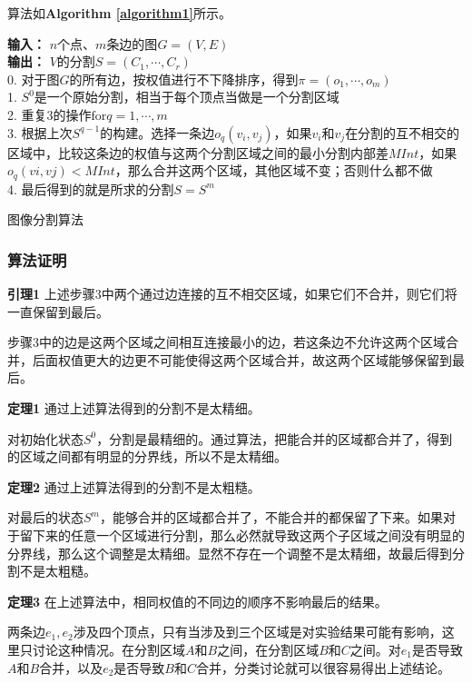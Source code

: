 \documentclass[a4paper, 12pt, UTF8]{article}
\begin{document}
算法如\textbf{Algorithm \ref{algorithm1}}所示。

\begin{algorithm}[h!]
\textbf{输入：} $n$个点、$m$条边的图$G = (V, E)$ \\
\textbf{输出：} $V$的分割$S = (C_1, \cdots, C_r)$ \\
0. 对于图$G$的所有边，按权值进行不下降排序，得到$\pi = (o_1, \cdots, o_m)$ \\
1. $S^0$是一个原始分割，相当于每个顶点当做是一个分割区域 \\
2. 重复3的操作$\text{for} q = 1, \cdots, m$ \\
3. 根据上次$S^{q - 1}$的构建。选择一条边$o_q(v_i, v_j)$，如果$v_i$和$v_j$在分割的互不相交的区域中，比较这条边的权值与这两个分割区域之间的最小分割内部差$MInt$，如果$o_q(vi, vj) < MInt$，那么合并这两个区域，其他区域不变；否则什么都不做 \\
4. 最后得到的就是所求的分割$S = S^m$
\caption{图像分割算法}
\label{algorithm1}
\end{algorithm}

\subsubsection{算法证明}

\textbf{引理1} 上述步骤3中两个通过边连接的互不相交区域，如果它们不合并，则它们将一直保留到最后。

步骤3中的边是这两个区域之间相互连接最小的边，若这条边不允许这两个区域合并，后面权值更大的边更不可能使得这两个区域合并，故这两个区域能够保留到最后。

\textbf{定理1} 通过上述算法得到的分割不是太精细。

对初始化状态$S^0$，分割是最精细的。通过算法，把能合并的区域都合并了，得到的区域之间都有明显的分界线，所以不是太精细。

\textbf{定理2} 通过上述算法得到的分割不是太粗糙。

对最后的状态$S^m$，能够合并的区域都合并了，不能合并的都保留了下来。如果对于留下来的任意一个区域进行分割，那么必然就导致这两个子区域之间没有明显的分界线，那么这个调整是太精细。显然不存在一个调整不是太精细，故最后得到分割不是太粗糙。

\textbf{定理3} 在上述算法中，相同权值的不同边的顺序不影响最后的结果。

两条边$e_1, e_2$涉及四个顶点，只有当涉及到三个区域是对实验结果可能有影响，这里只讨论这种情况。在分割区域$A$和$B$之间，在分割区域$B$和$C$之间。对$e_1$是否导致$A$和$B$合并，以及$e_2$是否导致$B$和$C$合并，分类讨论就可以很容易得出上述结论。
\end{document}
